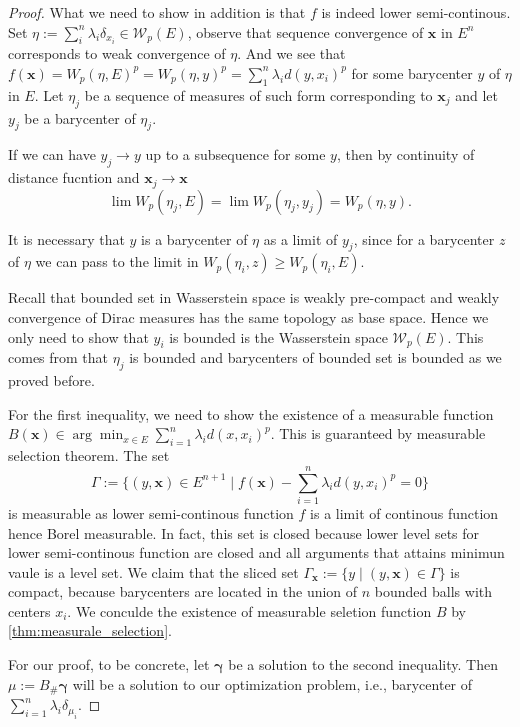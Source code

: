 \begin{proof}
	What we need to show in addition is that $f$ is indeed lower semi-continous. Set $\eta:= \sum_i^{n}\lambda_i \delta_{x_i} \in \mathcal{W}_p(E)$, observe that sequence convergence of $\boldsymbol{x}$ in $E^n$ corresponds to weak convergence of $\eta$. And we see that $f(\boldsymbol{x}) = W_p(\eta, E)^p=W_p(\eta, y)^p = \sum_{1}^{n} \lambda_i d(y, x_i)^p$ for some barycenter $y$ of $\eta$ in $E$. Let $\eta_j$ be a sequence of measures of such form corresponding to $\boldsymbol{x}_j$ and let $y_j$ be a barycenter of $\eta_j$.

	If we can have $y_j \rightarrow y$ up to a subsequence for some $y$, then by continuity of distance fucntion and $\boldsymbol{x}_j \rightarrow \boldsymbol{x}$
	\[
		\lim W_p(\eta_j, E) = \lim W_p(\eta_j, y_j) =  W_p(\eta, y).
	\]

	It is necessary that $y$ is a barycenter of $\eta$ as a limit of $y_j$, since for a barycenter $z$ of $\eta$ we can pass to the limit in $W_p(\eta_i, z) \geq W_p(\eta_i, E)$.


	Recall that bounded set in Wasserstein space is weakly pre-compact and weakly convergence of Dirac measures has the same topology as base space. Hence we only need to show that $y_i$ is bounded is the Wasserstein space $\mathcal{W}_p(E)$. This comes from that $\eta_j$ is bounded and barycenters of bounded set is bounded as we proved before.

	For the first inequality, we need to show the existence of a measurable function $B(\boldsymbol{x}) \in \arg \min_{x \in E} \sum_{i=1}^{n} \lambda_i d(x, x_i)^p$. This is guaranteed by measurable selection theorem. The set
	\[
	\Gamma:=	\{
		(y,\boldsymbol{x}) \in E^{n+1}\mid  f(\boldsymbol{x}) - \sum_{i=1}^{n} \lambda_i d(y,x_i)^p = 0
		\}
	\]
	is measurable as lower semi-continous function $f$ is a limit of continous function hence Borel measurable.
In fact, this set is closed because lower level sets for lower semi-continous function are closed
and all arguments that attains minimun vaule is a level set.
We claim that the sliced set $\Gamma_{\boldsymbol{x}}:=\{y \mid (y, \boldsymbol{x}) \in \Gamma\}$ is compact,
because barycenters are located in the union of $n$ bounded balls with centers $x_i$.
We conculde the existence of measurable seletion function $B$ by \cref{thm:measurale_selection}.

	For our proof, to be concrete, let $\boldsymbol \gamma$ be a solution to the second inequality.
	Then $\mu:= B_{\#}\boldsymbol \gamma$ will be a solution to our optimization problem, i.e., barycenter of $\sum_{i=1}^{n}\lambda_i \delta_{\mu_i}$.
\end{proof}

